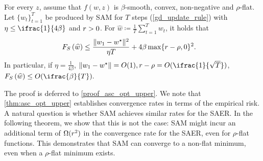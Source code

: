 \begin{theorem}
\label{thm:asc_opt_upper}
For every $z$, assume that $f(w,z)$ is
$\beta$-smooth, convex, non-negative and $\rho$-flat. Let $\{w_t\}_{t=1}^T$ be produced by SAM for $T$ steps
(\cref{gd_update_rule}) with $\eta \leq \ifrac{1}{4\beta}$ and $r >0$. For $\widehat{w} \coloneqq \frac{1}{T}\sum_{t=1}^T w_t$, it
holds that
\begin{align*}
    F_S\left(\widehat{w}\right)
    &\leq
    \frac{\|w_1-w^\star\|^2}{\eta T} + 4\beta\max\{r - \rho, 0\}^2
    .
\end{align*}
In particular, if $\eta=\frac{1}{4\beta}$, $\|w_1-w^\star\|=O(1),\rad-\rho=O(\ifrac{1}{\sqrt{T}})$, $F_S\left(\widehat{w}\right)
    \leq
    O(\ifrac{\beta}{T}).$
\end{theorem}
The proof is deferred to \cref{proof_asc_opt_upper}. We note that \cref{thm:asc_opt_upper} establishes convergence rates in terms of the empirical risk. 
A natural question is whether SAM achieves similar rates
for the SAER. 
In the following theorem, we show that this is not the case: SAM might incur an additional term of $\Omega(r^2)$ in the convergence rate for the SAER, even for $\rho$-flat functions. 
This demonstrates that SAM can converge to a non-flat minimum, even when a $\rho$-flat minimum exists. 

